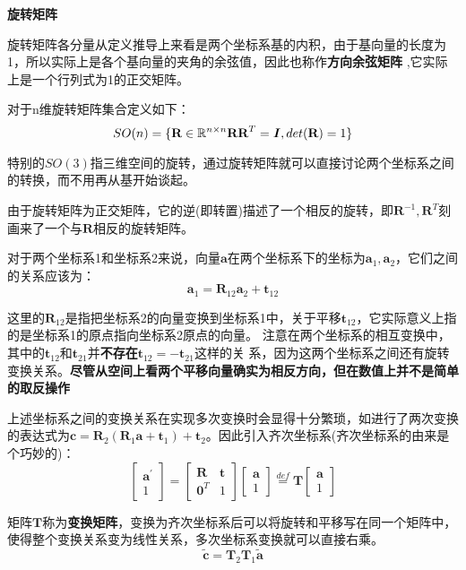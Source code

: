 \documentclass[10pt]{article}
\begin{document}
\textbf{旋转矩阵}

旋转矩阵各分量从定义推导上来看是两个坐标系基的内积，由于基向量的长度为1，所以实际上是各个基向量的夹角的余弦值，因此也称作\textbf{方向余弦矩阵}
,它实际上是一个行列式为1的正交矩阵。

对于n维旋转矩阵集合定义如下：
$$SO(n)=\{\textbf{R}\in \mathbb{R}^{n\times n} \textbf{R}\textbf{R}^{T}=\textbf{\emph{I}},det(\textbf{R})=1\}$$

特别的$SO(3)$指三维空间的旋转，通过旋转矩阵就可以直接讨论两个坐标系之间的转换，而不用再从基开始谈起。

由于旋转矩阵为正交矩阵，它的逆(即转置)描述了一个相反的旋转，即$\textbf{R}^{-1},\textbf{R}^{T}$刻画来了一个与$\textbf{R}$相反的旋转矩阵。

对于两个坐标系1和坐标系2来说，向量$\textbf{a}$在两个坐标系下的坐标为$\textbf{a}_1,\textbf{a}_2$，它们之间的关系应该为：
$$\textbf{a}_1=\textbf{R}_{12}\textbf{a}_2+\textbf{t}_{12}$$

这里的$\textbf{R}_{12}$是指把坐标系2的向量变换到坐标系1中，关于平移$\textbf{t}_{12}$，它实际意义上指的是坐标系1的原点指向坐标系2原点的向量。
注意在两个坐标系的相互变换中，其中的$\textbf{t}_{12}$和$\textbf{t}_{21}$并\textbf{不存在}$\textbf{t}_{12}=-\textbf{t}_{21}$这样的关
系，因为这两个坐标系之间还有旋转变换关系。\textbf{尽管从空间上看两个平移向量确实为相反方向，但在数值上并不是简单的取反操作}

上述坐标系之间的变换关系在实现多次变换时会显得十分繁琐，如进行了两次变换的表达式为$\textbf{c}=\textbf{R}_2(\textbf{R}_1\textbf{a}+\textbf{t}_1)
+\textbf{t}_2$。因此引入齐次坐标系(齐次坐标系的由来是个巧妙的)：
$$\left[\begin{array}{l}\textbf{a}^{'} \\ 1 \end{array}\right]=\left[\begin{array}{cc}\textbf{R}&\textbf{t} \\ \textbf{0}^{T}
    &1 \end{array}\right]\left[\begin{array}{l}\textbf{a} \\ 1 \end{array}\right] \overset{def}{=}\textbf{T}\left[\begin{array}{l}
        \textbf{a} \\ 1 \end{array}\right]$$

矩阵$\textbf{T}$称为\textbf{变换矩阵}，变换为齐次坐标系后可以将旋转和平移写在同一个矩阵中，使得整个变换关系变为线性关系，多次坐标系变换就可以直接右乘。
$$\widetilde{\textbf{c}}=\textbf{T}_2 \textbf{T}_1 \widetilde{\textbf{a}}$$
\end{document}
